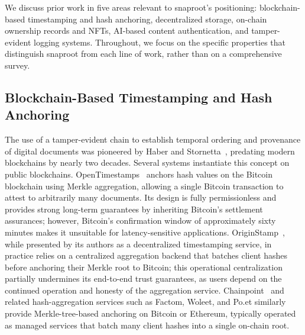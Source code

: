 \documentclass[11pt,a4paper]{article}
\begin{document}
We discuss prior work in five areas relevant to snaproot's positioning:
blockchain-based timestamping and hash anchoring, decentralized storage,
on-chain ownership records and NFTs, AI-based content authentication, and
tamper-evident logging systems. Throughout, we focus on the specific
properties that distinguish snaproot from each line of work, rather than
on a comprehensive survey.

\subsection{Blockchain-Based Timestamping and Hash Anchoring}
\label{sec:related:anchoring}

The use of a tamper-evident chain to establish temporal ordering and
provenance of digital documents was pioneered by Haber and
Stornetta~\cite{haber1991timestamp}, predating modern blockchains by
nearly two decades. Several systems instantiate this concept on public
blockchains. OpenTimestamps~\cite{todd2016ots} anchors hash values on
the Bitcoin blockchain using Merkle aggregation, allowing a single
Bitcoin transaction to attest to arbitrarily many documents. Its design
is fully permissionless and provides strong long-term guarantees by
inheriting Bitcoin's settlement assurances; however, Bitcoin's
confirmation window of approximately sixty minutes makes it unsuitable
for latency-sensitive applications. OriginStamp~\cite{gipp2015originstamp},
while presented by its authors as a decentralized timestamping service,
in practice relies on a centralized aggregation backend that batches
client hashes before anchoring their Merkle root to Bitcoin; this
operational centralization partially undermines its end-to-end trust
guarantees, as users depend on the continued operation and honesty of
the aggregation service. Chainpoint~\cite{vaughan2016chainpoint} and
related hash-aggregation services such as Factom, Woleet, and Po.et
similarly provide Merkle-tree-based anchoring on Bitcoin or Ethereum,
typically operated as managed services that batch many client hashes
into a single on-chain root.
\end{document}
